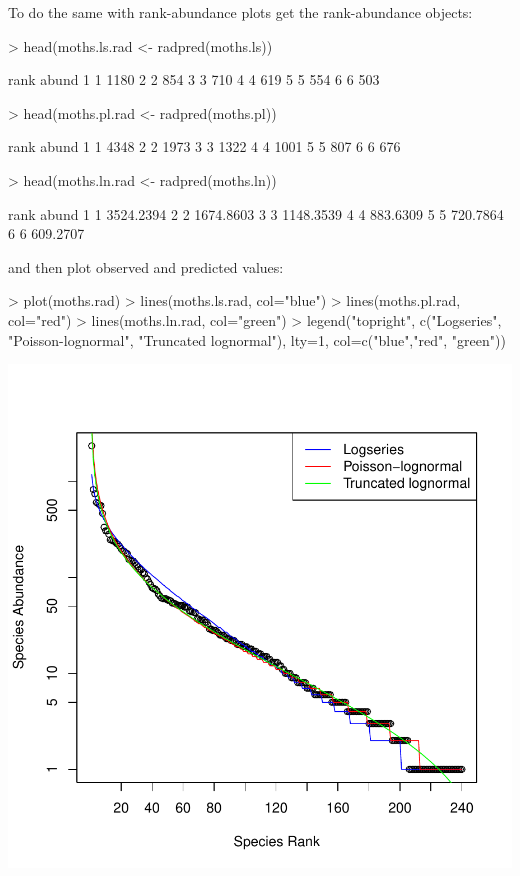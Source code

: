 \documentclass[11pt, A4]{article}
\begin{document}
To do the same with rank-abundance plots get the rank-abundance objects:

\begin{Schunk}
\begin{Sinput}
> head(moths.ls.rad <- radpred(moths.ls)) 
\end{Sinput}
\begin{Soutput}
  rank abund
1    1  1180
2    2   854
3    3   710
4    4   619
5    5   554
6    6   503
\end{Soutput}
\begin{Sinput}
> head(moths.pl.rad <- radpred(moths.pl))
\end{Sinput}
\begin{Soutput}
  rank abund
1    1  4348
2    2  1973
3    3  1322
4    4  1001
5    5   807
6    6   676
\end{Soutput}
\begin{Sinput}
> head(moths.ln.rad <- radpred(moths.ln))
\end{Sinput}
\begin{Soutput}
  rank     abund
1    1 3524.2394
2    2 1674.8603
3    3 1148.3539
4    4  883.6309
5    5  720.7864
6    6  609.2707
\end{Soutput}
\end{Schunk}

and then plot observed and predicted values:

\begin{Schunk}
\begin{Sinput}
> plot(moths.rad)
> lines(moths.ls.rad, col="blue")
> lines(moths.pl.rad, col="red")
> lines(moths.ln.rad, col="green")
> legend("topright", 
        c("Logseries", "Poisson-lognormal", "Truncated lognormal"), 
        lty=1, col=c("blue","red", "green"))
\end{Sinput}
\end{Schunk}
\includegraphics{sads_quick_reference-Rad-plots}
\end{document}

